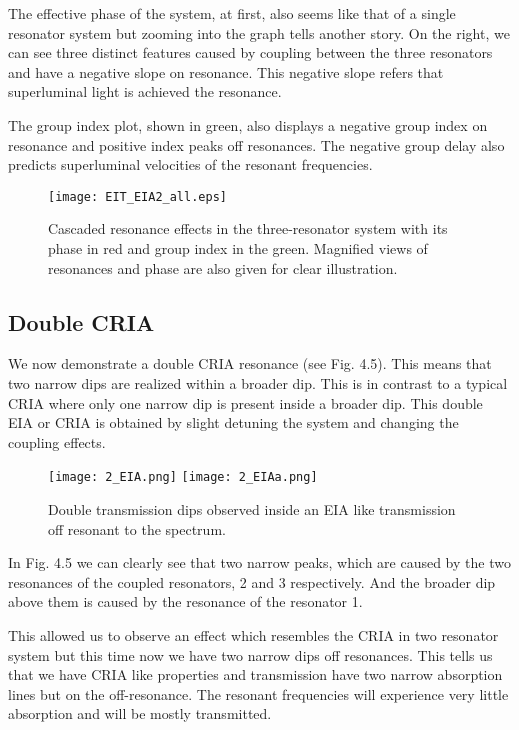The effective phase of the system, at first, also seems like that of a single resonator system but zooming into the graph tells another story. On the right, we can see three distinct features caused by coupling between the three resonators and have a negative slope on resonance. This negative slope refers that superluminal light is achieved the resonance.

The group index plot, shown in green, also displays a negative group index on resonance and positive index peaks off resonances. The negative group delay also predicts superluminal velocities of the resonant frequencies.
\newpage
\begin{figure}[h]
\centering
\texttt{[image: EIT\_EIA2\_all.eps]}
\caption{Cascaded resonance effects in the three-resonator system with its phase in red and group index in the green. Magnified views of resonances and phase are also given for clear illustration.}
\end{figure}

\subsection{Double CRIA}
We now demonstrate a double CRIA resonance (see Fig. 4.5). This means that two narrow dips are realized within a broader dip. This is in contrast to a typical CRIA where only one narrow dip is present inside a broader dip. This double EIA or CRIA is obtained by slight detuning the system and changing the coupling effects. 


\begin{figure}[t]
\centering
\texttt{[image: 2\_EIA.png]}
\texttt{[image: 2\_EIAa.png]}
\caption{Double transmission dips observed inside an EIA like transmission off resonant to the spectrum.}
\end{figure}

In Fig. 4.5 we can clearly see that two narrow peaks, which are caused by the two resonances of the coupled resonators, 2 and 3 respectively. And the broader dip above them is caused by the resonance of the resonator 1. 


This allowed us to observe an effect which resembles the CRIA in two resonator system but this time now we have two narrow dips off resonances. This tells us that we have CRIA like properties and transmission have two narrow absorption lines but on the off-resonance. The resonant frequencies will experience very little absorption and will be mostly transmitted. 

